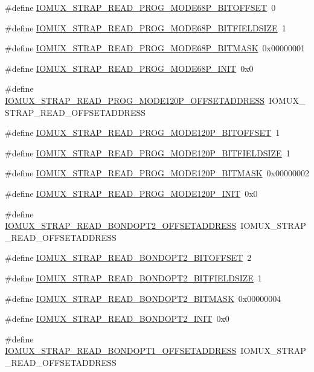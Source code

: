 \begin{DoxyCompactItemize}
\item 
\#define \hyperlink{a00560_ac94ddb57a6c11a19ed8522578b7add38}{IOMUX\_\-STRAP\_\-READ\_\-PROG\_\-MODE68P\_\-BITOFFSET}~0
\item 
\#define \hyperlink{a00560_a3c136cb9920a530b62c5825f4a3574da}{IOMUX\_\-STRAP\_\-READ\_\-PROG\_\-MODE68P\_\-BITFIELDSIZE}~1
\item 
\#define \hyperlink{a00560_ab70bb71153ef08c046ac3bf445454e97}{IOMUX\_\-STRAP\_\-READ\_\-PROG\_\-MODE68P\_\-BITMASK}~0x00000001
\item 
\#define \hyperlink{a00560_ae8e5ff8c17e372367efeb17029ea229e}{IOMUX\_\-STRAP\_\-READ\_\-PROG\_\-MODE68P\_\-INIT}~0x0
\item 
\#define \hyperlink{a00560_a104dcd0d847aa8ae7ebf4a1a7a0d0736}{IOMUX\_\-STRAP\_\-READ\_\-PROG\_\-MODE120P\_\-OFFSETADDRESS}~IOMUX\_\-STRAP\_\-READ\_\-OFFSETADDRESS
\item 
\#define \hyperlink{a00560_a88b8235c993fb95d71ed7922ff6c01a5}{IOMUX\_\-STRAP\_\-READ\_\-PROG\_\-MODE120P\_\-BITOFFSET}~1
\item 
\#define \hyperlink{a00560_a3b899b74c67b0747f613b351f6fc82a4}{IOMUX\_\-STRAP\_\-READ\_\-PROG\_\-MODE120P\_\-BITFIELDSIZE}~1
\item 
\#define \hyperlink{a00560_ad65428e7a0a697a7179338037ce8f7db}{IOMUX\_\-STRAP\_\-READ\_\-PROG\_\-MODE120P\_\-BITMASK}~0x00000002
\item 
\#define \hyperlink{a00560_a5b5bdae33298afb4d19a7bb2a000c2c9}{IOMUX\_\-STRAP\_\-READ\_\-PROG\_\-MODE120P\_\-INIT}~0x0
\item 
\#define \hyperlink{a00560_a82ef8d97ce74edbf871055bde695be1f}{IOMUX\_\-STRAP\_\-READ\_\-BONDOPT2\_\-OFFSETADDRESS}~IOMUX\_\-STRAP\_\-READ\_\-OFFSETADDRESS
\item 
\#define \hyperlink{a00560_af547e468904fd0e536904a080dded093}{IOMUX\_\-STRAP\_\-READ\_\-BONDOPT2\_\-BITOFFSET}~2
\item 
\#define \hyperlink{a00560_adc4b0286c3b47f6febd2ef806f225bae}{IOMUX\_\-STRAP\_\-READ\_\-BONDOPT2\_\-BITFIELDSIZE}~1
\item 
\#define \hyperlink{a00560_adc514499513201f8931d6bc4a9e98230}{IOMUX\_\-STRAP\_\-READ\_\-BONDOPT2\_\-BITMASK}~0x00000004
\item 
\#define \hyperlink{a00560_ac5cca85955b422aef04330f8f2cbaafa}{IOMUX\_\-STRAP\_\-READ\_\-BONDOPT2\_\-INIT}~0x0
\item 
\#define \hyperlink{a00560_ab25bb0f3652f013e5bf0a8e8b18b5f15}{IOMUX\_\-STRAP\_\-READ\_\-BONDOPT1\_\-OFFSETADDRESS}~IOMUX\_\-STRAP\_\-READ\_\-OFFSETADDRESS

\end{DoxyCompactItemize}
